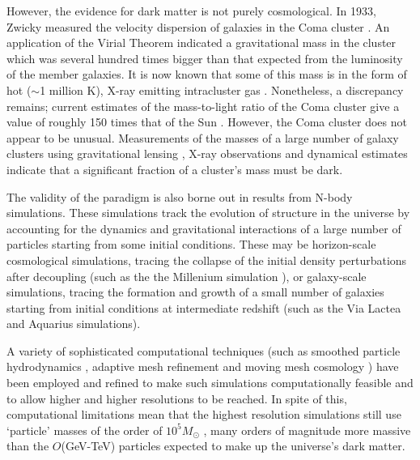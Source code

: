 However, the evidence for dark matter is not purely cosmological. In 1933, Zwicky measured the velocity dispersion of galaxies in the Coma cluster \cite{Zwicky:1933}. An application of the Virial Theorem indicated a gravitational mass in the cluster which was several hundred times bigger than that expected from the luminosity of the member galaxies. It is now known that some of this mass is in the form of hot ($\sim$1 million K), X-ray emitting intracluster gas \cite{Sanders:2013}. Nonetheless, a discrepancy remains; current estimates of the mass-to-light ratio of the Coma cluster give a value of roughly 150 times that of the Sun \cite{Fusco-Femiano:1994,Makino:1994}. However, the Coma cluster does not appear to be unusual. Measurements of the masses of a large number of galaxy clusters using gravitational lensing \cite{Okabe:2013}, X-ray observations \cite{Ettori:2013} and dynamical estimates \cite{Carlberg:1995} indicate that a significant fraction of a cluster's mass must be dark.

The validity of the \LCDM paradigm is also borne out in results from N-body simulations. These simulations track the evolution of structure in the universe by accounting for the dynamics and gravitational interactions  of a large number of particles starting from some initial conditions. These may be horizon-scale cosmological simulations, tracing the collapse of the initial density perturbations after decoupling (such as the the Millenium simulation \cite{Springel:2005}), or galaxy-scale simulations, tracing the formation and growth of a small number of galaxies starting from initial conditions at intermediate redshift (such as the Via Lactea \cite{Diemand:2006} and Aquarius \cite{Springel:2008} simulations).

 A variety of sophisticated computational techniques (such as smoothed particle hydrodynamics \cite{Stinson:2010}, adaptive mesh refinement \cite{Norman:1999} and moving mesh cosmology \cite{Springel:2010}) have been employed and refined to make such simulations computationally feasible and to allow higher and higher resolutions to be reached. In spite of this, computational limitations mean that the highest resolution simulations still use `particle' masses of the order of $10^5 M_{\odot}$ \cite{Pillepich:2014}, many orders of magnitude more massive than the $O$(GeV-TeV) particles expected to make up the universe's dark matter. 

